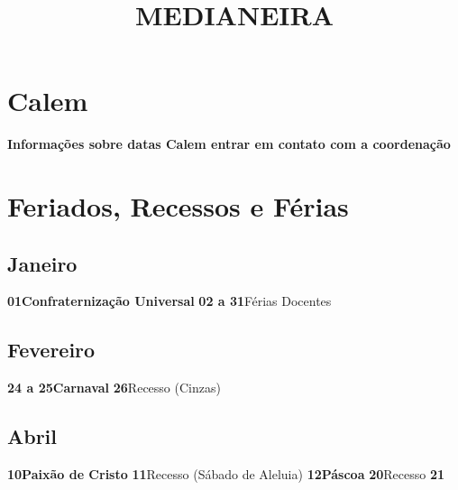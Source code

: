 \documentclass[thesis]{hmcposter}
\author{ }
\title{MEDIANEIRA}
\begin{document}
\begin{poster}
\normalsize\section{\color{hmcorange}Calem}\textbf{Informações sobre datas Calem entrar em contato com a coordenação} \newpage\onespacing \small \section{\color{hmcorange}Feriados, Recessos e Férias}\subsection{Janeiro}\textbf{01}\quad \quad \quad \quad \textbf{Confraternização Universal} \newline\textbf{02 a 31}\quad \quad Férias Docentes \newline\subsection{Fevereiro}\textbf{24 a 25}\quad \quad \textbf{Carnaval} \newline\textbf{26}\quad \quad \quad \quad Recesso (Cinzas) \newline\subsection{Abril}\textbf{10}\quad \quad \quad \quad \textbf{Paixão de Cristo} \newline\textbf{11}\quad \quad \quad \quad Recesso (Sábado de Aleluia) \newline\textbf{12}\quad \quad \quad \quad \textbf{Páscoa} \newline\textbf{20}\quad \quad \quad \quad Recesso \newline\textbf{21}\quad \quad \q
\end{poster}
\end{document}
